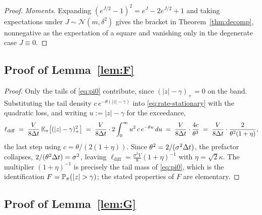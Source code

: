\begin{proof}
\emph{Moments.} Expanding $(e^{J/2}-1)^2 = e^{J} - 2 e^{J/2} + 1$ and taking expectations under $J \sim \mathcal{N}(m,\delta^2)$ gives the bracket in Theorem~\ref{thm:decomp}, nonnegative as the expectation of a square and vanishing only in the degenerate case $J\equiv 0$.
\end{proof}

\subsection{Proof of Lemma~\ref{lem:F}}\label{app:F}

\begin{proof}
Only the tails of \eqref{eq:pi0} contribute, since $(|z|-\gamma)_+ = 0$ on the band. Substituting the tail density $c\,e^{-\theta(|z|-\gamma)}$ into \eqref{eq:rate-stationary} with the quadratic loss, and writing $u := |z|-\gamma$ for the exceedance,
\[
\ell_{\mathrm{diff}} \;=\; \frac{V}{8\Delta t}\,\mathbb{E}_{\pi}\big[(|z|-\gamma)_+^2\big]
\;=\; \frac{V}{8\Delta t}\cdot 2\int_0^\infty u^2\,c\,e^{-\theta u}\,du
\;=\; \frac{V}{8\Delta t}\cdot\frac{4c}{\theta^3}
\;=\; \frac{V}{8\Delta t}\cdot\frac{2}{\theta^2(1+\eta)},
\]
the last step using $c=\theta/(2(1+\eta))$. Since $\theta^2 = 2/(\sigma^2\Delta t)$, the prefactor collapses, $2/(\theta^2\Delta t) = \sigma^2$, leaving
$\ell_{\mathrm{diff}} = \tfrac{\sigma^2V}{8}(1+\eta)^{-1}$ with $\eta=\sqrt2 \kappa$. The multiplier $(1+\eta)^{-1}$ is precisely the tail mass of \eqref{eq:pi0}, which is the identification $F = \Prob_\pi(|z|>\gamma)$; the stated properties of $F$ are elementary.
\end{proof}

\subsection{Proof of Lemma~\ref{lem:G}}\label{app:G}

